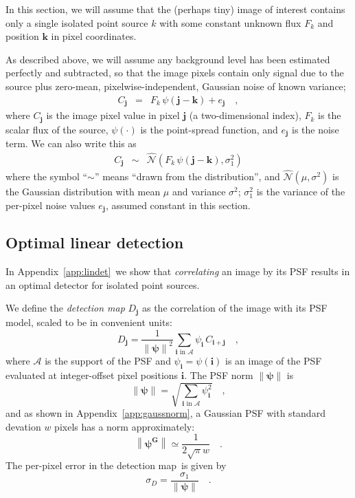 \documentclass[letterpaper,preprint]{aastex}
\newcommand{\appref}[1]{\mbox{Appendix~\ref{#1}}}
\newcommand{\detmap}{detection map}
\newcommand{\drawnfrom}{\sim}
\newcommand{\gaussianN}{\mathcal{N}}
\newcommand{\gaussx}[1]{\hat{\gaussianN}\!\left(#1\right)}
\newcommand{\psf}{\psi}
\newcommand{\psfat}[1]{\psf_{#1}}
\newcommand{\psfnorm}{\norm{\bm{\psf}}}
\newcommand{\norm}[1]{\left\lVert #1 \right\rVert}
\newcommand{\psfw}{w}
\newcommand{\noise}{e}
\renewcommand{\vec}[1]{\boldsymbol{#1}}
\newcommand{\ivec}{\vec{i}}
\newcommand{\jvec}{\vec{j}}
\newcommand{\kvec}{\vec{k}}
\newcommand{\iina}{\ivec \,\, \mathrm{in} \,\, \mathcal{A}}
\begin{document}
In this section, we will assume that the (perhaps tiny) image of
interest contains only a single isolated point source $k$ with some
constant unknown flux $F_k$ and position $\kvec$ in pixel coordinates.

As described above, we will assume any background level has been
estimated perfectly and subtracted, so that the image pixels contain
only signal due to the source plus zero-mean, pixelwise-independent,
Gaussian noise of known variance;
\begin{eqnarray}\displaystyle
  C_{\jvec} &=& F_k \, \psi(\jvec - \kvec)  + \noise_{\jvec} \quad ,
\end{eqnarray}
where $C_{\jvec}$ is the image pixel value in pixel $\jvec$ (a
two-dimensional index), $F_k$ is the scalar flux of the source,
$\psi(\cdot)$ is the point-spread function, and $\noise_{\jvec}$ is
the noise term.  We can also write this as
\begin{eqnarray}\displaystyle
  C_{\jvec} &\drawnfrom& \gaussx{F_k \, \psi(\jvec - \kvec), \sigma_1^2}
\label{eq:modelimg}
\end{eqnarray}
where the symbol ``$\drawnfrom$'' means ``drawn from the
distribution'', and $\gaussx{\mu,\sigma^2}$ is the Gaussian
distribution with mean $\mu$ and variance $\sigma^2$; $\sigma_1^2$ is
the variance of the per-pixel noise values $\noise_{\jvec}$, assumed
constant in this section.







\subsection{Optimal linear detection}

In \appref{app:lindet}\ we show that \emph{correlating} an image by
its PSF results in an optimal detector for isolated point sources.

We define the \emph{\detmap} $D_{\jvec}$ as the correlation of
the image with its PSF model, scaled to be in convenient units:
\begin{equation}
D_{\jvec} = \frac{1}{\psfnorm^2} \sum_{\iina} \psfat{\ivec} \, C_{\ivec + \jvec} \quad ,
\label{eq:detmap}
\end{equation}
where $\mathcal{A}$ is the support of the PSF and
$\psfat{\ivec} = \psf(\ivec)$ is an image of the PSF evaluated at
integer-offset pixel positions $\ivec$.  The PSF norm $\psfnorm$ is
\begin{equation}
\psfnorm = \sqrt{\sum_{\iina} \psfat{\ivec}^2} \quad ,
\end{equation}
and as shown in \appref{app:gaussnorm}, a Gaussian PSF with standard
devation $\psfw$ pixels has a norm approximately:
\begin{equation}
  \norm{\bm{\psf^G}} \simeq \frac{1}{2 \sqrt{\pi} \psfw} \quad .
\end{equation}
The per-pixel error in the \detmap\ is given by
\begin{equation}
\sigma_{D} = \frac{\sigma_1}{\psfnorm} \quad .
\end{equation}
\end{document}
